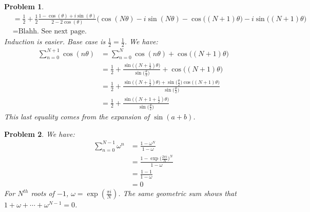 \documentclass{article}
\theoremstyle{plain}
\theoremstyle{normal}
\newtheorem{problem}{Problem}[section]
\begin{document}
\begin{problem}
\begin{align}
                &=\frac{1}{2}+
                    \frac{1}{2}\frac{1-\cos(\theta)+i\sin(\theta)}
                         {2-2\cos(\theta)}
                    \Big(\cos(N\theta)-i\sin(N\theta)-
                          \cos\big((N+1)\theta)-i\sin\big((N+1)\theta\Big)\\
                &=\textrm{Blahh. See next page.}
            \end{align}
            Induction is easier. Base case is $\tfrac{1}{2}=\tfrac{1}{2}$.
            We have:
            \begin{align}
                \sum_{n=0}^{N+1}\cos(n\theta)
                &=\sum_{n=0}^{N}\cos(n\theta)+\cos\big((N+1)\theta\big)\\
                &=\frac{1}{2}+
                    \frac{\sin\big((N+\frac{1}{2})\theta\big)}
                         {\sin\big(\frac{\theta}{2}\big)}
                +\cos\big((N+1)\theta)\\
                &=\frac{1}{2}+\frac{\sin\big((N+\frac{1}{2})\theta)+
                    \sin\big(\frac{\theta}{2}\big)\cos\big((N+1)\theta\big)}
                    {\sin\big(\frac{\theta}{2}\big)}\\
                &=\frac{1}{2}+\frac{\sin\big((N+1+\frac{1}{2})\theta\big)}
                    {\sin\big(\frac{\theta}{2}\big)}
            \end{align}
            This last equality comes from the expansion of $\sin(a+b)$.
        \end{problem}
        \begin{problem}
            We have:
            \begin{align}
                \sum_{n=0}^{N-1}\omega^{n}
                    &=\frac{1-\omega^{N}}{1-\omega}\\
                    &=\frac{1-\exp\big(\frac{2\pi{i}}{N}\big)^{N}}{1-\omega}\\
                    &=\frac{1-1}{1-\omega}\\
                    &=0
            \end{align}
            For $N^{th}$ roots of $-1$, $\omega=\exp(\tfrac{\pi{i}}{N})$.
            The same geometric sum shows that $1+\omega+\cdots+\omega^{N-1}=0$.
        \end{problem}
\end{document}
